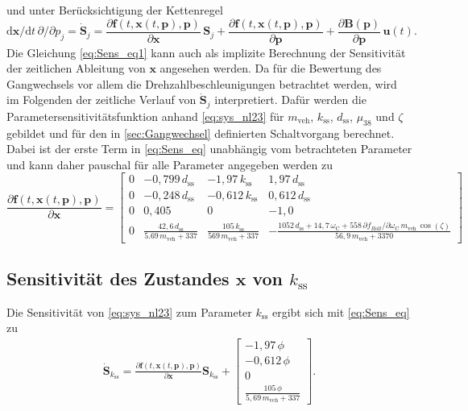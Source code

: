 und unter Berücksichtigung der Kettenregel
\begin{equation}\label{eq:Sens_eq}
\mathrm{d} \pmb{x}/\mathrm{d} t\,\partial/ \partial p_j = \dot{\pmb{S}}_j= \frac{\partial\pmb{f}(t,\pmb{x}(t,\pmb{p}),\pmb{p})}{\partial \pmb{x}}\,\pmb{S}_j+\frac{\partial\pmb{f}(t,\pmb{x}(t,\pmb{p}),\pmb{p})}{\partial \pmb{p}}+\frac{\partial \pmb{B}(\pmb{p})}{\partial \pmb{p}}\,\pmb{u}(t).
\end{equation}
Die Gleichung \eqref{eq:Sens_eq1} kann auch als implizite Berechnung der Sensitivität der zeitlichen Ableitung von $\pmb{x}$ angesehen werden. Da für die Bewertung des Gangwechsels vor allem die Drehzahlbeschleunigungen betrachtet werden, wird im Folgenden der zeitliche Verlauf von $\dot{\pmb{S}}_j$ interpretiert. Dafür werden die Parametersensitivitätsfunktion anhand \eqref{eq:sys_nl23} für $m_\mathrm{veh}$, $k_\mathrm{ss}$, $d_\mathrm{ss}$, $\mu_{38}$ und $\zeta$ gebildet und für den in \ref{sec:Gangwechsel} definierten Schaltvorgang berechnet. Dabei ist der erste Term in \eqref{eq:Sens_eq} unabhängig vom betrachteten Parameter und kann daher pauschal für alle Parameter angegeben werden zu
\begin{equation}
\frac{\partial\pmb{f}(t,\pmb{x}(t,\pmb{p}),\pmb{p})}{\partial \pmb{x}} = \begin{bmatrix} 0 & -0,799\,d_\mathrm{ss} & -1,97\,k_\mathrm{ss} & 1,97\,d_\mathrm{ss} \\  0 & -0,248\,d_\mathrm{ss} & -0,612\,k_\mathrm{ss} & 0,612\,d_\mathrm{ss} \\0 & 0,405 & 0 & -1,0 \\ 0 & \frac{42,6\,d_\mathrm{ss}}{5.69\,m_\mathrm{veh} + 337} & \frac{105\,k_\mathrm{ss}}{569\,m_\mathrm{veh}+337} & -\frac{1052\,d_\mathrm{ss} + 14,7\,\omega_\mathrm{C} + 558\,\partial f_{Roll}/\partial \omega_\mathrm{C}\,m_\mathrm{veh}\,\cos(\zeta)}{56,9\,m_\mathrm{veh} + 3370}\end{bmatrix}
\end{equation}

\subsection{Sensitivität des Zustandes $\pmb{x}$ von $k_\mathrm{ss}$}
Die Sensitivität von \eqref{eq:sys_nl23} zum Parameter $k_\mathrm{ss}$ ergibt sich mit \eqref{eq:Sens_eq} zu 
\begin{align}
\dot{\pmb{S}}_{k_\mathrm{ss}} = \frac{\partial\pmb{f}(t,\pmb{x}(t,\pmb{p}),\pmb{p})}{\partial \pmb{x}} \pmb{S}_{k_\mathrm{ss}} 
+ \begin{bmatrix} -1,97\,\phi \\ -0,612\,\phi \\ 0 \\ \frac{105\,\phi}{5,69\,m_\mathrm{veh} + 337} \end{bmatrix}.
\end{align}

